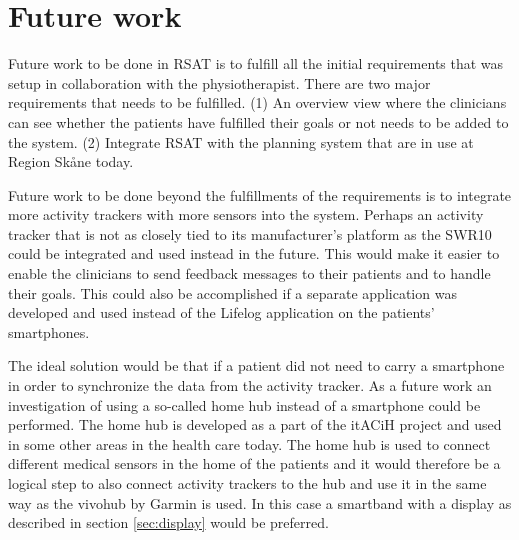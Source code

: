 \documentclass{cslthse-msc}
\begin{document}



\section{Future work}
Future work to be done in RSAT is to fulfill all the initial requirements that was setup in collaboration with the physiotherapist. There are two major requirements that needs to be fulfilled. (1) An overview view where the clinicians can see whether the patients have fulfilled their goals or not needs to be added to the system. (2) Integrate RSAT with the planning system that are in use at Region Skåne today. 

Future work to be done beyond the fulfillments of the requirements is to integrate more activity trackers with more sensors into the system.  Perhaps an activity tracker that is not as closely tied to its manufacturer’s platform as the SWR10 could be integrated and used instead in the future. This would make it easier to enable the clinicians to send feedback messages to their patients and to handle their goals. This could also be accomplished if a separate application was developed and used instead of the Lifelog application on the patients’ smartphones. 

The ideal solution would be that if a patient did not need to carry a smartphone in order to synchronize the data from the activity tracker. As a future work an investigation of using a so-called home hub instead of a smartphone could be performed. The home hub is developed as a part of the itACiH project and used in some other areas in the health care today. The home hub is used to connect different medical sensors in the home of the patients and it would therefore be a logical step to also connect activity trackers to the hub and use it in the same way as the vivohub by Garmin is used. In this case a smartband with a display as described in section \ref{sec:display} would be preferred. 
\end{document}
